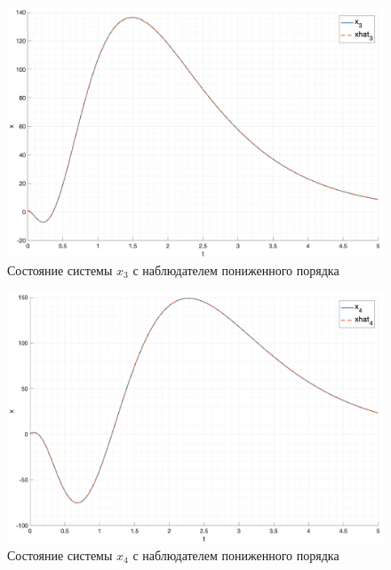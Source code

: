 \begin{figure}
    \centering
    \includegraphics[width=\textwidth]{media/plots/task4_x3_1.png}
    \caption{Состояние системы $x_3$ с наблюдателем пониженного порядка}
    \label{fig:task4_x3_1}
\end{figure}

\begin{figure}
    \centering
    \includegraphics[width=\textwidth]{media/plots/task4_x4_1.png}
    \caption{Состояние системы $x_4$ с наблюдателем пониженного порядка}
    \label{fig:task4_x4_1}
\end{figure}

